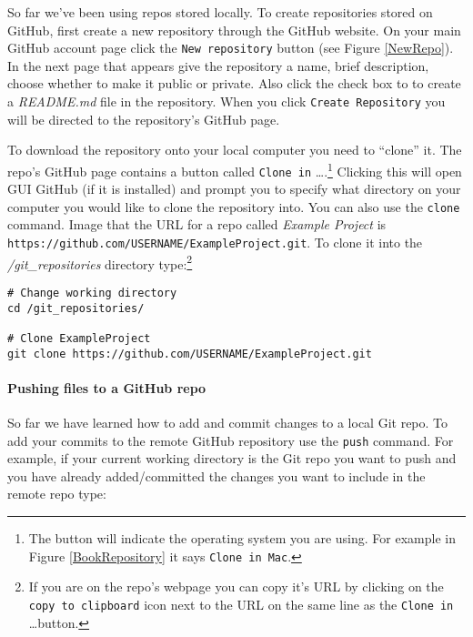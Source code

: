 So far we've been using repos stored locally. To create repositories stored on GitHub, first create a new repository through the GitHub website. On your main GitHub account page click the \texttt{New repository} button (see Figure \ref{NewRepo}). In the next page that appears give the repository a name, brief description, choose whether to make it public or private. Also click the check box to to create a \emph{README.md} file in the repository. When you click \texttt{Create Repository} you will be directed to the repository's GitHub page. 

To download the repository onto your local computer you need to ``clone'' it. The repo's GitHub page contains a button called \texttt{Clone in} \ldots.\footnote{The button will indicate the operating system you are using. For example in Figure \ref{BookRepository} it says \texttt{Clone in Mac}.} Clicking this will open GUI GitHub (if it is installed) and prompt you to specify what directory on your computer you would like to clone the repository into. You can also use the \texttt{clone} command. Image that the URL for a repo called \emph{Example Project} is \texttt{https://github.com/USERNAME/ExampleProject.git}. To clone it into the \emph{/git\_repositories} directory type:\footnote{If you are on the repo's webpage you can copy it's URL by clicking on the \texttt{copy to clipboard} icon next to the URL on the same line as the \texttt{Clone in} \ldots button.}

\begin{knitrout}
\color{fgcolor}\begin{kframe}
\begin{verbatim}
# Change working directory 
cd /git_repositories/

# Clone ExampleProject
git clone https://github.com/USERNAME/ExampleProject.git
\end{verbatim}
\end{kframe}
\end{knitrout}


\paragraph{Pushing files to a GitHub repo}

So far we have learned how to add and commit changes to a local Git repo. To add your commits to the remote GitHub repository use the \texttt{push} command. For example, if your current working directory is the Git repo you want to push and you have already added/committed the changes you want to include in the remote repo type:

